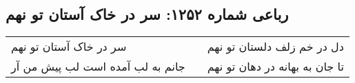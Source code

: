 \begin{center}
\section*{رباعی شماره ۱۲۵۲: سر در خاک آستان تو نهم}
\label{sec:1252}
\begin{longtable}{l p{0.5cm} r}
سر در خاک آستان تو نهم
&&
دل در خم زلف دلستان تو نهم
\\
جانم به لب آمده است لب پیش من آر
&&
تا جان به بهانه در دهان تو نهم
\\
\end{longtable}
\end{center}
